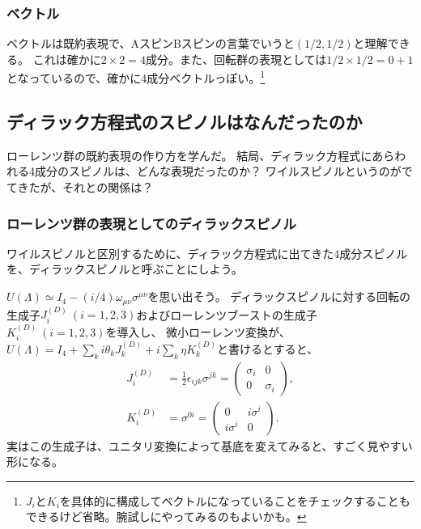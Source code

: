 \documentclass[10pt,a4paper]{jarticle}
\begin{document}
\subsubsection{ベクトル}
ベクトルは既約表現で、AスピンBスピンの言葉でいうと$(1/2,1/2)$と理解できる。
これは確かに$2\times 2 = 4$成分。また、回転群の表現としては$1/2 \times 1/2 = 0 +1$となっているので、確かに4成分ベクトルっぽい。\footnote{
$J_i$と$K_i$を具体的に構成してベクトルになっていることをチェックすることもできるけど省略。腕試しにやってみるのもよいかも。}



\subsection{ディラック方程式のスピノルはなんだったのか}
ローレンツ群の既約表現の作り方を学んだ。
結局、ディラック方程式にあらわれる4成分のスピノルは、どんな表現だったのか？
ワイルスピノルというのがでてきたが、それとの関係は？

\subsubsection{ローレンツ群の表現としてのディラックスピノル}
ワイルスピノルと区別するために、ディラック方程式に出てきた4成分スピノルを、ディラックスピノルと呼ぶことにしよう。

$U(\Lambda) \simeq I_4 - (i/4) \omega_{\mu\nu} \sigma^{\mu\nu}$を思い出そう。
ディラックスピノルに対する回転の生成子$J_i^{(D)}~(i=1,2,3)$およびローレンツブーストの生成子$K_i^{(D)}~(i=1,2,3)$を導入し、
微小ローレンツ変換が、$U(\Lambda) = I_4  + \sum_k i \theta_k J_k^{(D)} + i \sum_k \eta K_k^{(D)}$と書けるとすると、
\begin{align}
J_i^{(D)} &= \frac{1}{2} \epsilon_{ijk} \sigma^{jk} = \left(\begin{array}{cc}
\sigma_i & 0 \\
0 & \sigma_i
\end{array}\right), \\
K_i^{(D)} &= \sigma^{0i} = \left(\begin{array}{cc}
0 & i\sigma^i \\
i\sigma^i & 0
\end{array}\right).
\end{align}
実はこの生成子は、ユニタリ変換によって基底を変えてみると、すごく見やすい形になる。
\end{document}
